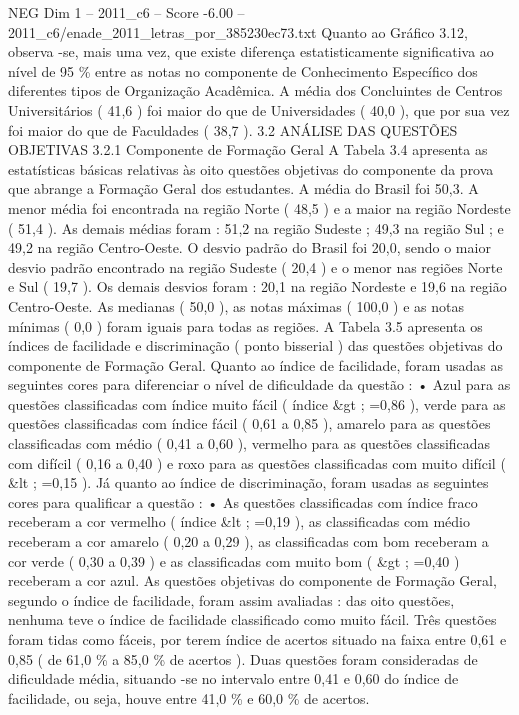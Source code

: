 \begin{textsample}{NEG Dim 1 – 2011\_c6 – Score -6.00 – 2011\_c6/enade\_2011\_letras\_por\_385230ec73.txt}
Quanto ao Gráfico 3.12, observa -se, mais uma vez, que existe diferença estatisticamente significativa ao nível de 95 \% entre as notas no componente de Conhecimento Específico dos diferentes tipos de Organização Acadêmica.
A média dos Concluintes de Centros Universitários ( 41,6 ) foi maior do que de Universidades ( 40,0 ), que por sua vez foi maior do que de Faculdades ( 38,7 ). 3.2 ANÁLISE DAS QUESTÕES OBJETIVAS 3.2.1 Componente de Formação Geral A Tabela 3.4 apresenta as estatísticas básicas relativas às oito questões objetivas do componente da prova que abrange a Formação Geral dos estudantes.
A média do Brasil foi 50,3.
A menor média foi encontrada na região Norte ( 48,5 ) e a maior na região Nordeste ( 51,4 ).
As demais médias foram : 51,2 na região Sudeste ; 49,3 na região Sul ; e 49,2 na região Centro-Oeste.
O desvio padrão do Brasil foi 20,0, sendo o maior desvio padrão encontrado na região Sudeste ( 20,4 ) e o menor nas regiões Norte e Sul ( 19,7 ).
Os demais desvios foram : 20,1 na região Nordeste e 19,6 na região Centro-Oeste.
As medianas ( 50,0 ), as notas máximas ( 100,0 ) e as notas mínimas ( 0,0 ) foram iguais para todas as regiões.
A Tabela 3.5 apresenta os índices de facilidade e discriminação ( ponto bisserial ) das questões objetivas do componente de Formação Geral.
Quanto ao índice de facilidade, foram usadas as seguintes cores para diferenciar o nível de dificuldade da questão : • Azul para as questões classificadas com índice muito fácil ( índice \&gt ; =0,86 ), verde para as questões classificadas com índice fácil ( 0,61 a 0,85 ), amarelo para as questões classificadas com médio ( 0,41 a 0,60 ), vermelho para as questões classificadas com difícil ( 0,16 a 0,40 ) e roxo para as questões classificadas com muito difícil ( \&lt ; =0,15 ).
Já quanto ao índice de discriminação, foram usadas as seguintes cores para qualificar a questão : • As questões classificadas com índice fraco receberam a cor vermelho ( índice \&lt ; =0,19 ), as classificadas com médio receberam a cor amarelo ( 0,20 a 0,29 ), as classificadas com bom receberam a cor verde ( 0,30 a 0,39 ) e as classificadas com muito bom ( \&gt ; =0,40 ) receberam a cor azul.
As questões objetivas do componente de Formação Geral, segundo o índice de facilidade, foram assim avaliadas : das oito questões, nenhuma teve o índice de facilidade classificado como muito fácil.
Três questões foram tidas como fáceis, por terem índice de acertos situado na faixa entre 0,61 e 0,85 ( de 61,0 \% a 85,0 \% de acertos ).
Duas questões foram consideradas de dificuldade média, situando -se no intervalo entre 0,41 e 0,60 do índice de facilidade, ou seja, houve entre 41,0 \% e 60,0 \% de acertos.

\end{textsample}
